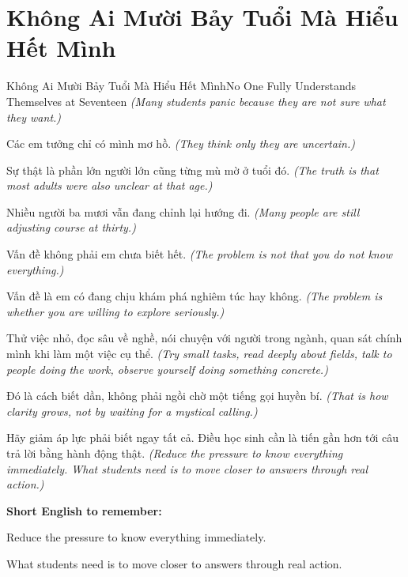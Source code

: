 \section{Không Ai Mười Bảy Tuổi Mà Hiểu Hết Mình}
\begin{truyen}{Không Ai Mười Bảy Tuổi Mà Hiểu Hết Mình}{No One Fully Understands Themselves at Seventeen}
\textit{(Many students panic because they are not sure what they want.)}

Các em tưởng chỉ có mình mơ hồ.
\textit{(They think only they are uncertain.)}

Sự thật là phần lớn người lớn cũng từng mù mờ ở tuổi đó.
\textit{(The truth is that most adults were also unclear at that age.)}

Nhiều người ba mươi vẫn đang chỉnh lại hướng đi.
\textit{(Many people are still adjusting course at thirty.)}

Vấn đề không phải em chưa biết hết.
\textit{(The problem is not that you do not know everything.)}

Vấn đề là em có đang chịu khám phá nghiêm túc hay không.
\textit{(The problem is whether you are willing to explore seriously.)}

Thử việc nhỏ, đọc sâu về nghề, nói chuyện với người trong ngành, quan sát chính mình khi làm một việc cụ thể.
\textit{(Try small tasks, read deeply about fields, talk to people doing the work, observe yourself doing something concrete.)}

Đó là cách biết dần, không phải ngồi chờ một tiếng gọi huyền bí.
\textit{(That is how clarity grows, not by waiting for a mystical calling.)}

\end{truyen}

\begin{baihoc}
Hãy giảm áp lực phải biết ngay tất cả. Điều học sinh cần là tiến gần hơn tới câu trả lời bằng hành động thật.
\textit{(Reduce the pressure to know everything immediately. What students need is to move closer to answers through real action.)}
\end{baihoc}

\begin{ghinhoanh}
\textbf{Short English to remember:}

Reduce the pressure to know everything immediately.

What students need is to move closer to answers through real action.

\end{ghinhoanh}


